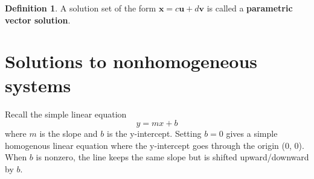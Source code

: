 \documentclass[
]{book}
\theoremstyle{definition}
\newtheorem{definition}{Definition}[chapter]
\theoremstyle{definition}
\theoremstyle{definition}
\theoremstyle{remark}
\begin{document}
\begin{definition}
\protect\hypertarget{def:unnamed-chunk-97}{}{\label{def:unnamed-chunk-97} } A solution set of the form \(\mathbf{x} = c \mathbf{u} + d \mathbf{v}\) is called a \textbf{parametric vector solution}.
\end{definition}

\hypertarget{solutions-to-nonhomogeneous-systems}{%
\section{Solutions to nonhomogeneous systems}\label{solutions-to-nonhomogeneous-systems}}

Recall the simple linear equation
\[
y = mx + b
\]
where \(m\) is the slope and \(b\) is the y-intercept. Setting \(b = 0\) gives a simple homogenous linear equation where the y-intercept goes through the origin (0, 0). When \(b\) is nonzero, the line keeps the same slope but is shifted upward/downward by \(b\).
\end{document}
